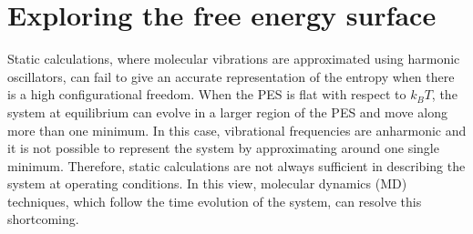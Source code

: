 \section{Exploring the free energy surface}
Static calculations, where molecular vibrations are approximated using harmonic oscillators, can fail to give an accurate representation of the entropy when there is a high configurational freedom. When the PES is flat with respect to $k_B T$, the system at equilibrium can evolve in a larger region of the PES and move along more than one minimum. In this case, vibrational frequencies are anharmonic and it is not possible to represent the system by approximating around one single minimum. Therefore, static calculations are not always sufficient in describing the system at operating conditions. In this view, molecular dynamics (MD) techniques, which follow the time evolution of the system, can resolve this shortcoming. 

